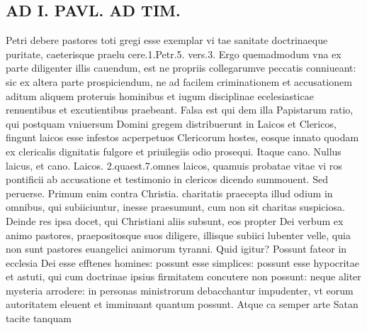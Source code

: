 \documentclass{article}
\begin{document}
\begin{pages}
\section*{AD I. PAVL. AD TIM. }
\marginpar{[ p.312 ]}\pstart Petri debere pastores toti gregi esse exemplar vi tae sanitate doctrinaeque puritate, caeterisque praelu cere.1.Petr.5. vers.3. Ergo quemadmodum vna ex parte diligenter illis cauendum, est ne propriis collegarumve peccatis conniueant: sic ex altera parte prospiciendum, ne ad facilem criminationem et accusationem aditum aliquem proteruis hominibus et iugum disciplinae ecelesiasticae renuentibus et excutientibus praebeant. Falsa est qui dem illa Papistarum ratio, qui postquam vniuersum Domini gregem distribuerunt in Laicos et Clericos, fingunt laicos esse infestos acperpetuos Clericorum hostes, eosque innato quodam ex clericalis dignitatis fulgore et priuilegiis odio prosequi. Itaque cano. Nullus laicus, et cano. Laicos. 2.quaest.7.omnes laicos, quamuis probatae vitae vi ros pontificii ab accusatione et testimonio in clericos dicendo summouent. Sed peruerse. Primum enim contra Christia. charitatis praecepta illud odium in omnibus, qui subiiciuntur, inesse praesumunt, cum non sit charitas suspiciosa. Deinde res ipsa docet, qui Christiani aliis subsunt, eos propter Dei verbum ex animo pastores, praepositosque suos diligere, illisque subiici lubenter velle, quia non sunt pastores euangelici animorum tyranni. Quid igitur? Possunt fateor in ecclesia Dei esse efftenes homines: possunt esse simplices: possunt esse hypocritae et astuti, qui cum doctrinae ipsius firmitatem concutere non possunt: neque aliter mysteria arrodere: in personas ministrorum debacchantur impudenter, vt eorum autoritatem eleuent et imminuant quantum possunt. Atque ca semper arte Satan tacite tanquam  \pend

\end{pages}
\end{document}
